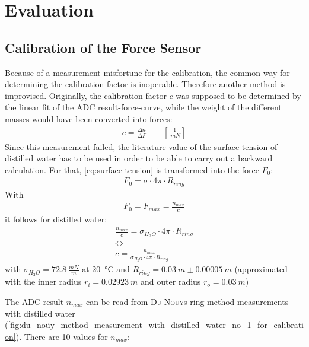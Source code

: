 \chapter{Evaluation}
%
    \section{Calibration of the Force Sensor}
        Because of a measurement misfortune for the calibration, the common way for determining the calibration factor is inoperable. Therefore another method is improvised. Originally, the calibration factor $ c $ was supposed to be determined by the linear fit of the ADC result-force-curve, while the weight of the different masses would have been converted into forces:
        \begin{align}
            c=\frac{\Delta n}{\Delta F} \qquad \left[\frac{1}{\SI{}{mN}}\right]
        \end{align}
        Since this measurement failed, the literature value of the surface tension of distilled water has to be used in order to be able to carry out a backward calculation. For that, \cref{eq:surface tension} is transformed into the force $ F_0 $:
        \begin{align*}
            F_0=\sigma \cdot 4\pi \cdot R_{ring}
        \end{align*}
        With
        \begin{align}
            F_0=F_{max}=\frac{n_{max}}{c}
            \label{eq:force}
        \end{align}
        it follows for distilled water:
        \begin{gather}
            \frac{n_{max}}{c} = \sigma_{H_2O} \cdot 4\pi \cdot R_{ring} \nonumber \\
            \Leftrightarrow \nonumber \\
            c = \frac{n_{max}}{\sigma_{H_2O} \cdot 4\pi \cdot R_{ring}}
            \label{eq:calibration factor}
        \end{gather}
        with \(\sigma_{H_2O}=\SI{72.8}{\frac{mN}{m}}\) at \SI{20}{\celsius} \cite{Eichler.2016} and \(R_{ring} = \SI{0.03}{m} \pm \SI{0.00005}{m}\)
        (approximated with the inner radius $ r_i=\SI{0.02923}{m} $ and outer radius $ r_o=\SI{0.03}{m} $)\par\medskip
        The ADC result \(n_{max}\) can be read from \textsc{Du Noüy}s ring method measurements with distilled water (\cref{fig:du_noüy_method_measurement_with_distilled_water_no_1_for_calibration}).
        There are 10 values for \(n_{max}\):
